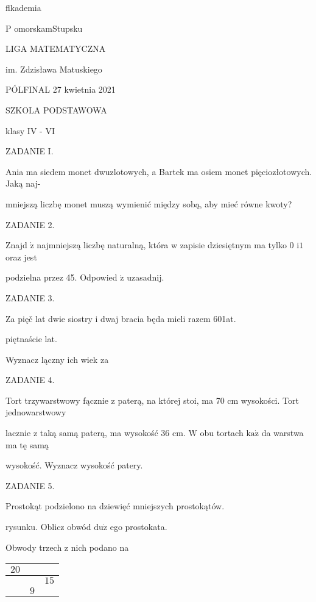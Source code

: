 \documentclass[a4paper,12pt]{article}
\begin{document}
flkademia

P omorskamStupsku

LIGA MATEMATYCZNA

im. Zdzisława Matuskiego

PÓLFINAL 27 kwietnia 2021

SZKOLA PODSTAWOWA

klasy IV - VI

ZADANIE I.

Ania ma siedem monet dwuzlotowych, a Bartek ma osiem monet pięciozłotowych. Jaką naj-

mniejszą liczbę monet muszą wymienić między sobą, aby mieć równe kwoty?

ZADANIE 2.

Znajd $\acute{\mathrm{z}}$ najmniejszą liczbę naturalną, która w zapisie dziesiętnym ma tylko 0 $\mathrm{i} 1$ oraz jest

podzielna przez 45. Odpowied $\acute{\mathrm{z}}$ uzasadnij.

ZADANIE 3.

Za pięč lat dwie siostry i dwaj bracia będa mieli razem 601at.

piętnaście lat.

Wyznacz lączny ich wiek za

ZADANIE 4.

Tort trzywarstwowy fącznie z paterą, na której stoi, ma 70 cm wysokości. Tort jednowarstwowy

lacznie z taką samą paterą, ma wysokość 36 cm. $\mathrm{W}$ obu tortach $\mathrm{k}\mathrm{a}\dot{\mathrm{z}}$ da warstwa ma tę samą

wysokość. Wyznacz wysokość patery.

ZADANIE 5.

Prostokąt podzielono na dziewięć mniejszych prostokątów.

rysunku. Oblicz obwód $\mathrm{d}\mathrm{u}\dot{\mathrm{z}}$ ego prostokata.

Obwody trzech z nich podano na
\begin{center}
\begin{tabular}{|l|l|l|}
\hline
\multicolumn{1}{|l|}{$20$}&	\multicolumn{1}{|l|}{}&	\multicolumn{1}{|l|}{}	\\
\hline
\multicolumn{1}{|l|}{}&	\multicolumn{1}{|l|}{}&	\multicolumn{1}{|l|}{ $15$}	\\
\hline
\multicolumn{1}{|l|}{}&	\multicolumn{1}{|l|}{ $9$}&	\multicolumn{1}{|l|}{}	\\
\hline
\end{tabular}

\end{center}
\end{document}
